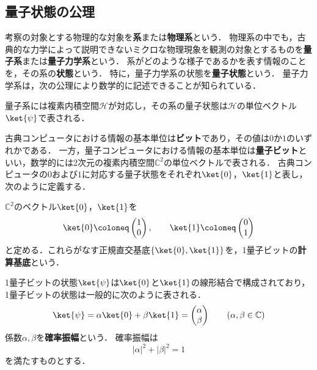\subsection{量子状態の公理}

考察の対象とする物理的な対象を\textbf{系}または\textbf{物理系}という．
物理系の中でも，古典的な力学によって説明できないミクロな物理現象を観測の対象とするものを\textbf{量子系}または\textbf{量子力学系}という．
系がどのような様子であるかを表す情報のことを，その系の\textbf{状態}という．
特に，量子力学系の状態を\textbf{量子状態}という．
量子力学系は，次の公理により数学的に記述できることが知られている．

\begin{axiom}[量子状態]
  \label{ax:quantum-state}
  量子系には複素内積空間$\mathcal H$が対応し，その系の量子状態は$\mathcal H$の単位ベクトル$\ket{\psi}$で表される．
\end{axiom}

古典コンピュータにおける情報の基本単位は\textbf{ビット}であり，その値は$0$か$1$のいずれかである．
一方，量子コンピュータにおける情報の基本単位は\textbf{量子ビット}といい，数学的には2次元の複素内積空間$\mathbb C^2$の単位ベクトルで表される．
古典コンピュータの$0$および$1$に対応する量子状態をそれぞれ$\ket{0}$，$\ket{1}$と表し，次のように定義する．

\begin{defi}[計算基底]
  $\mathbb C^2$のベクトル$\ket{0}$，$\ket{1}$を
  \begin{equation*}
    \ket{0}\coloneq\begin{pmatrix}1\\0\end{pmatrix},
    \qquad
    \ket{1}\coloneq\begin{pmatrix}0\\1\end{pmatrix}
  \end{equation*}
  と定める．これらがなす正規直交基底$\{\ket{0},\ket{1}\}$を，1量子ビットの\textbf{計算基底}という．
\end{defi}

1量子ビットの状態$\ket{\psi}$は$\ket{0}$と$\ket{1}$の線形結合で構成されており，1量子ビットの状態は一般的に次のように表される．
\begin{equation*}
  \ket{\psi}=\alpha\ket{0}+\beta\ket{1} = \begin{pmatrix}\alpha\\\beta\end{pmatrix}
  \qquad
  (\alpha,\beta\in\mathbb C)
\end{equation*}
係数$\alpha,\beta$を\textbf{確率振幅}という．
確率振幅は
\begin{equation}
  |\alpha|^2+|\beta|^2=1
  \label{eq:single-qubit-state-normalization}
\end{equation}
を満たすものとする．

